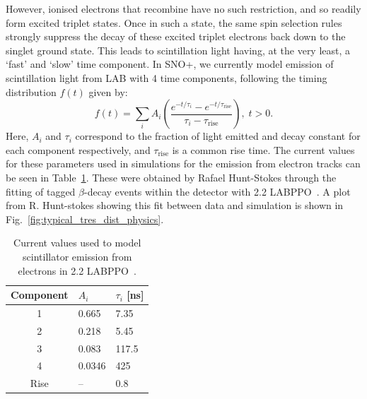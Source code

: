 However, ionised electrons that recombine have no such restriction, and so readily form excited triplet states. Once in such a state, the same spin selection rules strongly suppress the decay of these excited triplet electrons back down to the singlet ground state. This leads to scintillation light having, at the very least, a `fast' and `slow' time component. In SNO+, we currently model emission of scintillation light from LAB with 4 time components, following the timing distribution $f(t)$ given by:
\begin{equation}
    f(t) = \sum_{i}A_{i}\left(\frac{e^{-t/\tau_{i}}-e^{-t/\tau_{\mathrm{rise}}}}{\tau_{i}-\tau_\mathrm{rise}}\right),\; t > 0.
\end{equation}
Here, $A_{i}$ and $\tau_{i}$ correspond to the fraction of light emitted and decay constant for each component respectively, and $\tau_\mathrm{rise}$ is a common rise time. The current values for these parameters used in simulations for the emission from electron tracks can be seen in Table~\ref{tab:scint_reem_params}. These were obtained by Rafael Hunt-Stokes through the fitting of tagged  $\beta$-decay events within the detector with \SI{2.2}{\gpl} LABPPO~\cite{hunt-stokesEmissionTimingTuning2022}. A plot from R. Hunt-stokes showing this fit between data and simulation is shown in Fig.~\ref{fig:typical_tres_dist_physics}.

\begin{table}
    \centering
    \begin{tabular}{c p{2cm} p{2cm}}
        \hline
        Component & $A_{i}$ & $\tau_{i}$ [ns] \\ \hline \hline
        1         & 0.665   & 7.35  \\
        2         & 0.218   & 5.45  \\
        3         & 0.083   & 117.5 \\
        4         & 0.0346  & 425   \\
        Rise      & --      & 0.8   \\
        \hline
    \end{tabular}
    \caption[Current values used to model scintillator emission from electrons in \SI{2.2}{\gpl} LABPPO]
    {Current values used to model scintillator emission from electrons in \SI{2.2}{\gpl} LABPPO~\cite{latorreNewMeasurementsTiming2016,hunt-stokesEmissionTimingTuning2022}.}
    \label{tab:scint_reem_params}
\end{table}

